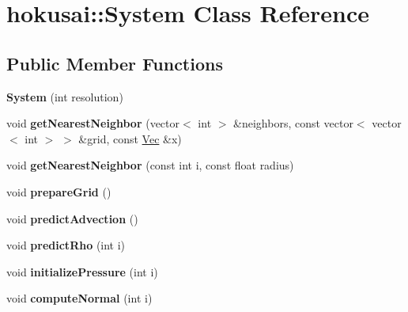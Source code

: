 \hypertarget{classhokusai_1_1System}{\section{hokusai\+:\+:System Class Reference}
\label{classhokusai_1_1System}
}
\subsection*{Public Member Functions}
\begin{DoxyCompactItemize}
\item 
\hypertarget{classhokusai_1_1System_ac69d6b544cc0c28bcbe21881eafaf4f4}{{\bfseries System} (int resolution)}\label{classhokusai_1_1System_ac69d6b544cc0c28bcbe21881eafaf4f4}

\item 
\hypertarget{classhokusai_1_1System_a0d3fa37f929ce81b00949bc057787885}{void {\bfseries get\+Nearest\+Neighbor} (vector$<$ int $>$ \&neighbors, const vector$<$ vector$<$ int $>$ $>$ \&grid, const \hyperlink{classhokusai_1_1Vec3}{Vec} \&x)}\label{classhokusai_1_1System_a0d3fa37f929ce81b00949bc057787885}

\item 
\hypertarget{classhokusai_1_1System_adba058b687571d9fde96cce55532cdfd}{void {\bfseries get\+Nearest\+Neighbor} (const int i, const float radius)}\label{classhokusai_1_1System_adba058b687571d9fde96cce55532cdfd}

\item 
\hypertarget{classhokusai_1_1System_ab9b62d601ea3688a8e750029957954d5}{void {\bfseries prepare\+Grid} ()}\label{classhokusai_1_1System_ab9b62d601ea3688a8e750029957954d5}

\item 
\hypertarget{classhokusai_1_1System_a64334b7f182e61fee1461dcd59afee48}{void {\bfseries predict\+Advection} ()}\label{classhokusai_1_1System_a64334b7f182e61fee1461dcd59afee48}

\item 
\hypertarget{classhokusai_1_1System_a24981d71c6a6bbb542989fb043ba0c27}{void {\bfseries predict\+Rho} (int i)}\label{classhokusai_1_1System_a24981d71c6a6bbb542989fb043ba0c27}

\item 
\hypertarget{classhokusai_1_1System_ad03bdd283b7e2ced76f49586b6539e0d}{void {\bfseries initialize\+Pressure} (int i)}\label{classhokusai_1_1System_ad03bdd283b7e2ced76f49586b6539e0d}

\item 
\hypertarget{classhokusai_1_1System_a3dd4abd4ca3c3df144f4544af62e924c}{void {\bfseries compute\+Normal} (int i)}\label{classhokusai_1_1System_a3dd4abd4ca3c3df144f4544af62e924c}


\end{DoxyCompactItemize}
